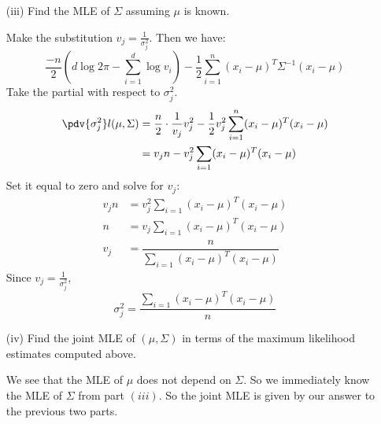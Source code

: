 \documentclass{article}
\begin{document}
\begin{itemize}
\begin{itemize}
                \item [(iii)] Find the MLE of $\Sigma$ assuming $\mu$ is known.
                    \begin{answer}
                        Make the substitution $v_{j} = \frac{1}{\sigma_{j}^{2}}$. Then we have:
                            \begin{equation*}
                                \dfrac{-n}{2} \left(d\log{2\pi} - \sum_{i = 1}^{d}\log{v_{i}}\right) - \dfrac{1}{2}\sum_{i = 1}^{n}(x_{i} - \mu)^{T}\Sigma^{-1}(x_{i} - \mu)
                            \end{equation*}
                        Take the partial with respect to $\sigma_{j}^{2}$.
                            \begin{align*}
                                \pdv{\sigma_{j}^{2}}l(\mu, \Sigma) &= \dfrac{n}{2}\cdot \dfrac{1}{v_{j}}v_{j}^{2} - \dfrac{1}{2}v_{j}^{2}\sum_{i = 1}^{n}(x_{i} - \mu)^{T}(x_{i} - \mu) \\
                                                                   &= v_{j}n - v_{j}^{2}\sum_{i = 1}(x_{i} - \mu)^{T}(x_{i} - \mu)                                                        
                            \end{align*}
                        Set it equal to zero and solve for $v_{j}$:
                            \begin{align*}
                                v_{j}n                                                                     &=         v_{j}^{2}\sum_{i = 1}(x_{i} - \mu)^{T}(x_{i} - \mu)          \\
                                n                                                                          &=         v_{j}\sum_{i = 1}(x_{i} - \mu)^{T}(x_{i} - \mu)          \\
                                v_{j} &=  {\dfrac{n}{\sum_{i = 1}(x_{i} - \mu)^{T}(x_{i} - \mu)}}   
                            \end{align*}
                        Since $v_{j} = \frac{1}{\sigma_{j}^{2}}$,
                            \begin{equation*}
                                \sigma_{j}^{2} = \dfrac{\sum_{i = 1}(x_{i} - \mu)^{T}(x_{i} - \mu)}{n}
                            \end{equation*}
                    \end{answer}

                \item [(iv)] Find the joint MLE of $(\mu, \Sigma)$ in terms of the maximum likelihood estimates computed above.
                    \begin{answer}
                        We see that the MLE of $\mu$ does not depend on $\Sigma$. So we immediately know the MLE of $\Sigma$ from part $(iii)$. So the joint MLE is given by our answer to the previous two parts.
                    \end{answer}
            \end{itemize}


\end{itemize}
\end{document}
